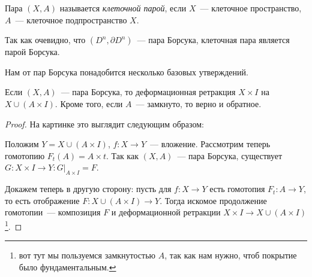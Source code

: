     \begin{definition}
        Пара $(X, A)$ называется \emph{клеточной парой}, если $X$~--- клеточное пространство, $A$~--- клеточное подпространство $X$.
    \end{definition}

    \begin{remark}
       Так как очевидно, что $(D^n, \partial D^n)$~--- пара Борсука, клеточная пара является парой Борсука.
    \end{remark}   

    Нам от пар Борсука понадобится несколько базовых утверждений.


    \begin{theorem}
        Если $(X, A)$~--- пара Борсука, то деформационная ретракция $X \times I$ на $X \cup (A \times I)$.
        Кроме того, если $A$~--- замкнуто, то верно и обратное.
    \end{theorem}
    \begin{proof}
    На картинке это выглядит следующим образом:
        \begin{center}
        \end{center}

        Положим $Y = X \cup (A \times I)$, $f\colon X \to Y$~--- вложение. Рассмотрим теперь гомотопию $F_{t}(A) = A \times t$.
        Так как $(X, A)$~--- пара Борсука, существует $G\colon X \times I \to Y\colon G\vert_{A \times I} = F$.

        Докажем теперь в другую сторону:  пусть для $f\colon X \to Y$ есть гомотопия $F_{t}\colon A \to Y$, то
        есть отображение $F\colon X \cup (A \times I) \to Y$. Тогда искомое продолжение гомотопии~---
        композиция $F$ и деформационной ретракции $X \times I \to X \cup (A \times I)$\footnote{вот тут мы пользуемся замкнутостью $A$, так как нам нужно, чтоб покрытие было фундаментальным. }.
    \end{proof}

